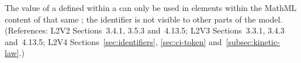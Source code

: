 The  value of a \Parameter defined within a \KineticLaw
can only be used in  elements within the MathML content
of that same \KineticLaw; the identifier is not visible to other
parts of the model.  (References: L2V2 Sections~3.4.1, 3.5.3 
and~4.13.5; L2V3 Sections~3.3.1, 3.4.3 and~4.13.5; L2V4 
Sections~\ref{sec:identifiers}, \ref{sec:ci-token}
and~\ref{subsec:kinetic-law}.)
